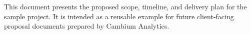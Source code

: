 This document presents the proposed scope, timeline, and delivery plan for the sample project. It is intended as a reusable example for future client-facing proposal documents prepared by Cambium Analytics.